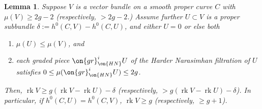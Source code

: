 \documentclass[12 pt]{amsart}
\theoremstyle{plain}
\newtheorem{lemma}[subsubsection]{Lemma}
\theoremstyle{definition}
\theoremstyle{remark}
\numberwithin{equation}{section}
\DeclareMathOperator\rk{rk}
\begin{document}
\begin{lemma}
	\label{lemma:abstract-lower-bound-on-rank}
	Suppose $V$ is a vector bundle on a smooth proper curve $C$ with 
	$\mu(V) \geq 2g - 2$ (respectively, $> 2g-2$.)
	Assume further $U \subset V$ is a proper subbundle 
	$\delta := h^0(C, V) - h^0(C, U)$,
	and either $U = 0$ or else both
	\begin{enumerate}
		\item 	$\mu(U) \leq \mu(V)$, and
		\item each graded piece 
	$\on{gr}^i_{\on{HN}}U$ of the Harder Narasimhan filtration of $U$
	satisfies $0 \leq \mu(\on{gr}^i_{\on{HN}}U) \leq 2g$.
	\end{enumerate}
	Then, $\rk V \geq g (\rk V - \rk U)-\delta$ (respectively, $> g (\rk V - \rk
	U)-\delta$).
	In particular, if 
	$h^0(C, U)  = h^0(C, V)$, $\rk V \geq g$ (respectively, $\geq g+1$).
\end{lemma}
\end{document}
